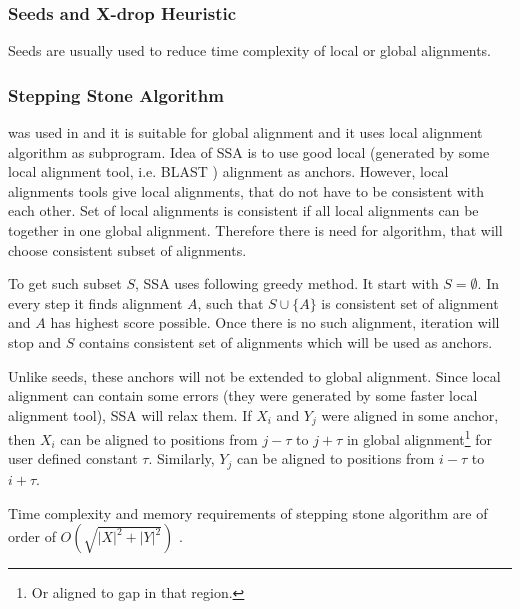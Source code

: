 \subsubsection{Seeds and X-drop Heuristic}

Seeds are usually used to reduce time complexity of local or global alignments. 



\subsubsection{Stepping Stone Algorithm}

 was used in
\cite{Mayer2002,Pairagon2009} and it is
suitable for global alignment and it uses local alignment algorithm as
subprogram. Idea of SSA is to use good local (generated by some local alignment
tool, i.e. BLAST \cite{}) alignment as anchors. However, local alignments tools 
give local alignments, that do not have to be consistent with each other. Set of 
local alignments is consistent if all local alignments can be together in one global
alignment. Therefore there is need for algorithm, that will choose consistent
subset of alignments.

To get such subset $S$, SSA uses following greedy method. It start with
$S=\emptyset$. In every step it finds alignment $A$, such that $S\cup\{A\}$ is
consistent set of alignment and $A$ has highest score possible. Once there is no
such alignment, iteration will stop and $S$ contains consistent set of
alignments which will be used as anchors.

Unlike seeds, these anchors will not be extended to global alignment. Since
local alignment can contain some errors (they were generated by some faster
local alignment tool), SSA will relax them. If $X_i$ and $Y_j$ were aligned in
some anchor, then $X_i$ can be aligned to positions from $j-\tau$ to $j+\tau$ in
global alignment\footnote{Or aligned to gap in that region.} for user defined
constant $\tau$. Similarly, $Y_j$ can be aligned to positions from $i-\tau$ to
$i+\tau$.

Time complexity and memory requirements of stepping stone algorithm are of order
of $O(\sqrt{|X|^2+|Y|^2})$ \cite{Mayer2002}.


